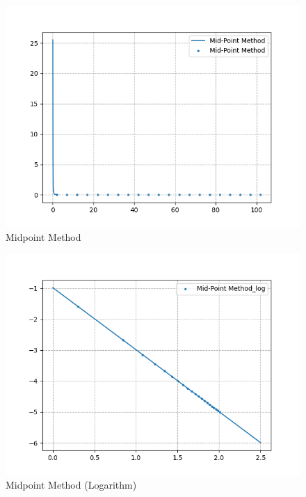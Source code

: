 \documentclass[12pt]{article}
\begin{document}
\begin{figure}[H]
    \centering
    \includegraphics[width=13cm]{midpt.png}
    \caption{Midpoint Method}
\end{figure}

\begin{figure}[H]
    \centering
    \includegraphics[width=13cm]{midlog.png}
    \caption{Midpoint Method (Logarithm)}
\end{figure}
\end{document}
